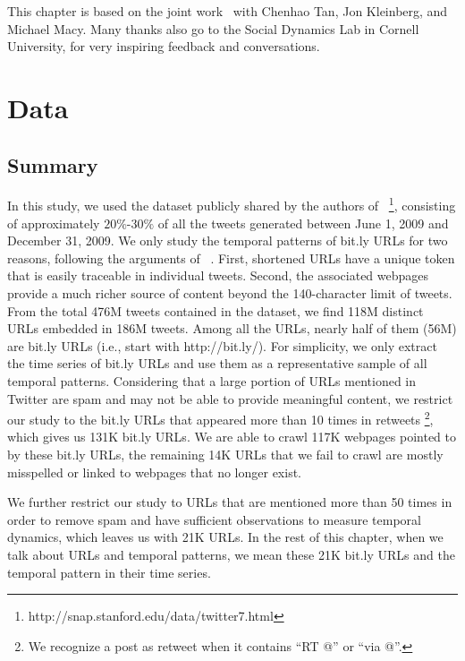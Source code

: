 \documentclass[phd,tocprelim]{cornell}
\begin{document}
This chapter is based on the joint work~\cite{Wu-ICWSM-2011} with Chenhao Tan, Jon Kleinberg, and Michael Macy. Many thanks also go to the Social Dynamics Lab in Cornell University, for very inspiring feedback and conversations.

\section{Data}

\subsection{Summary}
In this study, we used the dataset publicly shared by the authors of ~\cite{Yang-2011}\footnote{http://snap.stanford.edu/data/twitter7.html}, 
consisting of approximately $20\%$-$30\%$ of all the tweets generated between June 1, 2009 and December 31, 2009. 
We only study the temporal patterns of bit.ly URLs for two reasons, 
following the arguments of ~\cite{Wu-Twitter-2011}. First, 
shortened URLs have a unique token that is easily traceable in individual tweets. 
Second, the associated webpages provide a much richer source of content beyond the 140-character limit of tweets. 
From the total 476M tweets contained in the dataset, we find 118M distinct URLs embedded in 186M tweets. 
Among all the URLs, nearly half of them (56M) are bit.ly URLs (i.e., start with http://bit.ly/). 
For simplicity, we only extract the time series of bit.ly URLs and use them as a representative sample of all temporal patterns. 
Considering that a large portion of URLs mentioned in Twitter are spam and may not be able to provide meaningful content, 
we restrict our study to the bit.ly URLs that appeared more than 10 times in retweets \footnote{We recognize a post as retweet when it contains ``RT @'' or ``via @''.}, 
which gives us 131K bit.ly URLs. 
We are able to crawl 117K webpages pointed to by these bit.ly URLs, the remaining 14K URLs that we fail to crawl are mostly misspelled 
or linked to webpages that no longer exist. 

We further restrict our study to URLs that are mentioned more than 50 times in order to remove spam and have sufficient observations to measure temporal dynamics, which leaves us with 21K URLs. 
In the rest of this chapter, when we talk about URLs and temporal patterns, we mean these 21K bit.ly URLs and the temporal pattern in their time series.
\end{document}
